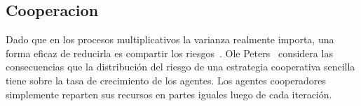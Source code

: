 \documentclass[a4paper,10pt]{article}
\begin{document}
% 

\subsection{Cooperacion}

Dado que en los procesos multiplicativos la varianza realmente importa, una forma eficaz de reducirla es compartir los riesgos~\cite{yaari2010-cooperationEvolution, peters2015-evolutionaryAdvantageOfCooperation}.
Ole Peters~\cite{peters2015-evolutionaryAdvantageOfCooperation} considera las consecuencias que la distribución del riesgo de una estrategia cooperativa sencilla tiene sobre la tasa de crecimiento de los agentes.
Los agentes cooperadores simplemente reparten sus recursos en partes iguales luego de cada iteración.
\end{document}
